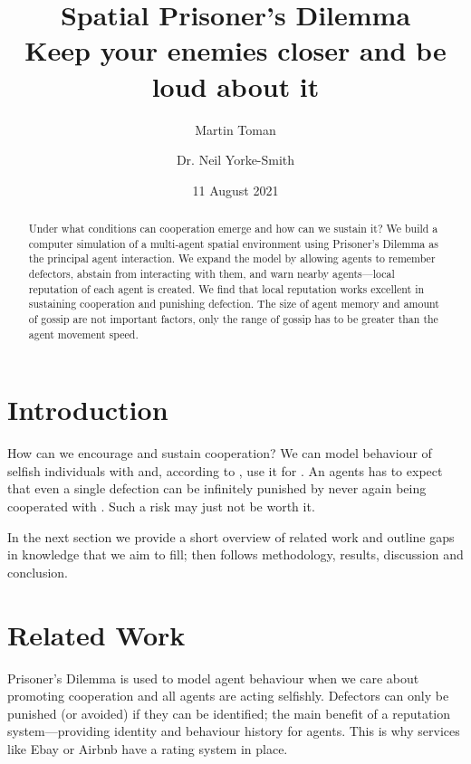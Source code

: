 \documentclass[english]{article}
\begin{document}

\title{
Spatial Prisoner’s Dilemma \\
Keep your enemies closer and be loud about it
}
\author{
  Martin Toman
\and
  Dr. Neil Yorke-Smith
}
\date{11 August 2021}
\maketitle


\begin{abstract}

Under what conditions can cooperation emerge and how can we sustain it?
We build a computer simulation of a multi-agent spatial environment using Prisoner's Dilemma as the principal agent interaction.
We expand the model by allowing agents to remember defectors, abstain from interacting with them, and warn nearby agents---local reputation of each agent is created.
We find that local reputation works excellent in sustaining cooperation and punishing defection.
The size of agent memory and amount of gossip are not important factors,
only the range of gossip has to be greater than the agent movement speed.

\end{abstract}



\section{Introduction}

How can we encourage and sustain cooperation?
We can model behaviour of selfish individuals with 
and, according to \citet{Axelrod84}, use it for .
An agents has to expect that even a single defection can be infinitely punished by never again being cooperated with \citep{GRIM}.
Such a risk may just not be worth it.

In the next section we provide a short overview of related work and outline gaps in knowledge that we aim to fill; then follows methodology, results, discussion and conclusion.



\section{Related Work}
Prisoner's Dilemma is used to model agent behaviour when we care about promoting cooperation and all agents are acting selfishly.
Defectors can only be punished (or avoided) if they can be identified;
the main benefit of a reputation system---providing identity and behaviour history for agents.
This is why services like Ebay or Airbnb have a rating system in place.
\end{document}

